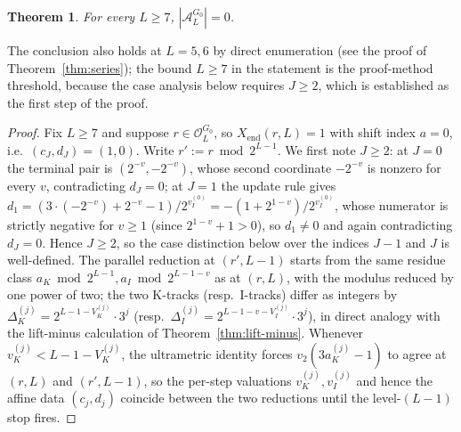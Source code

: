 \documentclass[11pt,reqno]{amsart}
\theoremstyle{plain}
\newtheorem{theorem}{Theorem}[section]
\theoremstyle{definition}
\theoremstyle{remark}
\newcommand{\Obs}{\mathcal{O}}
\newcommand{\Atom}{\mathcal{A}}
\newcommand{\Xend}{X_{\mathrm{end}}}
\newcommand{\Vk}{V_{K}}
\newcommand{\Vi}{V_{I}}
\newcommand{\vk}{v_{K}}
\newcommand{\vi}{v_{I}}
\begin{document}
\begin{theorem}\label{thm:no-G0-atom}
For every $L \ge 7$, $|\Atom_L^{G_0}| = 0$.
\end{theorem}

The conclusion also holds at $L = 5, 6$ by direct enumeration (see the
proof of Theorem~\ref{thm:series}); the bound $L \ge 7$ in the statement
is the proof-method threshold, because the case analysis below requires
$J \ge 2$, which is established as the first step of the proof.

\begin{proof}
Fix $L \ge 7$ and suppose $r \in \Obs_L^{G_0}$, so $\Xend(r, L) = 1$ with
shift index $a = 0$, i.e.\ $(c_J, d_J) = (1, 0)$. Write $r' := r \bmod 2^{L-1}$.
We first note $J \ge 2$: at $J = 0$ the terminal pair is $(2^{-v}, -2^{-v})$,
whose second coordinate $-2^{-v}$ is nonzero for every $v$, contradicting
$d_J = 0$; at $J = 1$ the update rule gives
$d_1 = (3 \cdot (-2^{-v}) + 2^{-v} - 1)/2^{\vi^{(0)}} = -(1 + 2^{1-v})/2^{\vi^{(0)}}$,
whose numerator is strictly negative for $v \ge 1$ (since $2^{1-v} + 1 > 0$),
so $d_1 \ne 0$ and again contradicting $d_J = 0$. Hence $J \ge 2$, so the case
distinction below over the indices $J - 1$ and $J$ is well-defined.
The parallel reduction at $(r', L-1)$ starts from the same residue class
$a_K \bmod 2^{L-1}, a_I \bmod 2^{L-1-v}$ as at $(r, L)$, with the modulus
reduced by one power of two; the two K-tracks (resp.\ I-tracks) differ as
integers by $\Delta_K^{(j)} = 2^{L-1-\Vk^{(j)}} \cdot 3^j$ (resp.\
$\Delta_I^{(j)} = 2^{L-1-v-\Vi^{(j)}} \cdot 3^j$), in direct analogy with
the lift-minus calculation of Theorem~\ref{thm:lift-minus}. Whenever
$\vk^{(j)} < L - 1 - \Vk^{(j)}$, the ultrametric identity forces
$v_2(3 a_K^{(j)} - 1)$ to agree at $(r, L)$ and $(r', L-1)$, so the
per-step valuations $\vk^{(j)}, \vi^{(j)}$ and hence the affine data
$(c_j, d_j)$ coincide between the two reductions until the level-$(L-1)$
stop fires.


\end{proof}
\end{document}
